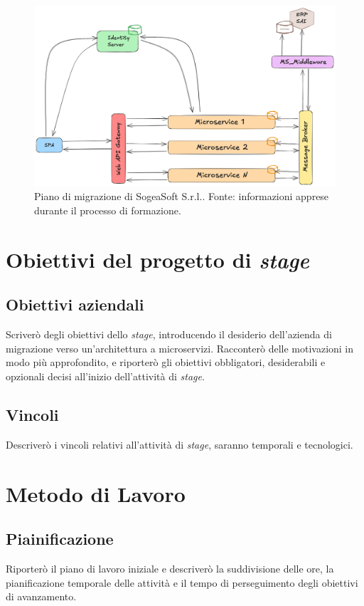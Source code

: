         \begin{figure}[H]
            \centering
            \includegraphics[width=0.6\linewidth]{BCS-Tessi/images/migrazione.png}
            \caption[Piano di migrazione di SogeaSoft S.r.l.]{Piano di migrazione di SogeaSoft S.r.l.. Fonte: informazioni apprese durante il processo di formazione. }
            \label{fig:enter-label}
        \end{figure}
        
    \section{Obiettivi del progetto di \textit{stage}}
        \subsection{Obiettivi aziendali}
        Scriverò degli obiettivi dello \textit{stage}, introducendo il desiderio dell'azienda di migrazione verso un'architettura a microservizi. Racconterò delle motivazioni in modo più approfondito, e riporterò gli obiettivi obbligatori, desiderabili e opzionali decisi all'inizio dell'attività di \textit{stage}.
        \subsection{Vincoli}
        Descriverò i vincoli relativi all'attività di \textit{stage}, saranno temporali e tecnologici. 

    \section{Metodo di Lavoro}
        \subsection{Piainificazione}
        Riporterò il piano di lavoro iniziale e descriverò la suddivisione delle ore, la pianificazione temporale delle attività e il tempo di perseguimento degli obiettivi di avanzamento. 
